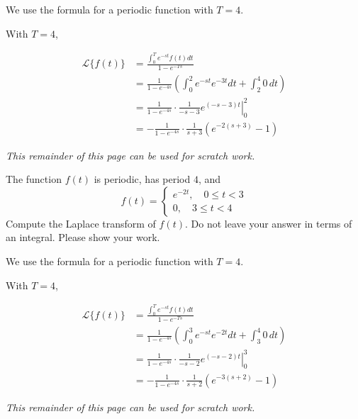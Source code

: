 \ifnum {} {\color{DarkBlue} 
    We use the formula for a periodic function with $T=4$. 
    
        With $T=4$,
        
        \begin{align}
            \mathcal{L}\{f(t)\} &=  \frac{\int_{0}^{T} e^{-st} f(t) dt}{1 - e^{-Ts}} \\
            &= \frac{1}{1 - e^{-4s}} \left( \int_{0}^{2} e^{-st} e^{-3t} dt + \int_2^4 0 \, dt \right)\\
            &= \frac{1}{1 - e^{-4s}} \cdot \frac{1}{-s-3} \left. e^{(-s-3)t}\right|_0^2 \\
            &= -\frac{1}{1 - e^{-4s}} \cdot \frac{1}{s+3} \left( e^{-2(s+3)} - 1 \right)
        \end{align}
        \newpage
} 
\else 
    \newpage
    \begin{center}
        \textit{This remainder of this page can be used for scratch work. }
    \end{center}
    \vfill
\fi
\fi



\ifnum {}
\question[3] 
The function $f(t)$ is periodic, has period $4$, and 
        $$f(t) = \begin{cases} e^{-2t}, \quad 0 \le t < 3 \\ 0, \quad 3 \le t < 4 \end{cases}$$
        Compute the Laplace transform of $f(t)$. Do not leave your answer in terms of an integral. Please show your work. 

\ifnum {} {\color{DarkBlue} 
    We use the formula for a periodic function with $T=4$. 
    
        With $T=4$,
        
        \begin{align}
            \mathcal{L}\{f(t)\} &=  \frac{\int_{0}^{T} e^{-st} f(t) dt}{1 - e^{-Ts}} \\
            &= \frac{1}{1 - e^{-4s}} \left( \int_{0}^{3} e^{-st} e^{-2t} dt + \int_3^4 0 \, dt \right)\\
            &= \frac{1}{1 - e^{-4s}} \cdot \frac{1}{-s-2} \left. e^{(-s-2)t}\right|_0^3 \\
            &= -\frac{1}{1 - e^{-4s}} \cdot \frac{1}{s+2} \left( e^{-3(s+2)} - 1 \right)
        \end{align}
} 
\else 
    \newpage
    \begin{center}
        \textit{This remainder of this page can be used for scratch work. }
    \end{center}
    \vfill
\fi
\fi



